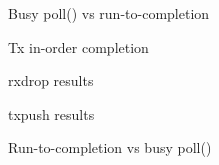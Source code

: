 \documentclass{beamer}
\begin{document}
  \begin{frame}{Busy poll() vs run-to-completion}
    \resizebox{\textwidth}{!}{}
  \end{frame}
  \begin{frame}{Tx in-order completion}
    \resizebox{\textwidth}{!}{}
  \end{frame}
  \begin{frame}{rxdrop results}
  \end{frame}
  \begin{frame}{txpush results}
  \end{frame}
  \begin{frame}{Run-to-completion vs busy poll()}
  \end{frame}
\end{document}
